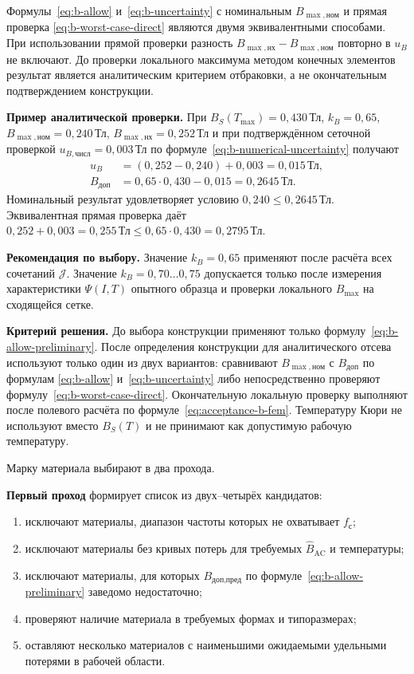 \documentclass[14pt,a4paper]{extarticle}
\newcommand{\recommend}{\par\noindent\textbf{Рекомендация по выбору.} }
\newcommand{\criterion}{\par\noindent\textbf{Критерий решения.} }
\begin{document}
Формулы~\eqref{eq:b-allow} и~\eqref{eq:b-uncertainty} с номинальным
$B_{\max,\text{ном}}$ и прямая проверка
\eqref{eq:b-worst-case-direct} являются двумя эквивалентными способами.
При использовании прямой проверки разность
$B_{\max,\text{нх}}-B_{\max,\text{ном}}$ повторно в $u_B$ не включают.
До проверки локального максимума методом конечных элементов результат
является аналитическим критерием отбраковки, а не окончательным
подтверждением конструкции.

\textbf{Пример аналитической проверки.}
При $B_S(T_{\max})=0{,}430\,\text{Тл}$, $k_B=0{,}65$,
$B_{\max,\text{ном}}=0{,}240\,\text{Тл}$,
$B_{\max,\text{нх}}=0{,}252\,\text{Тл}$ и при подтверждённом сеточной
проверкой $u_{B,\text{числ}}=0{,}003\,\text{Тл}$ по
формуле~\eqref{eq:b-numerical-uncertainty} получают
\begin{align}
 u_B&=(0{,}252-0{,}240)+0{,}003
 =0{,}015\,\text{Тл},
 \label{eq:b-uncertainty-example}\\
 B_{\text{доп}}&=
 0{,}65\cdot0{,}430-0{,}015
 =0{,}2645\,\text{Тл}.
 \label{eq:b-allow-example}
\end{align}
Номинальный результат удовлетворяет условию
$0{,}240\leq0{,}2645\,\text{Тл}$. Эквивалентная прямая проверка даёт
$0{,}252+0{,}003=0{,}255\,\text{Тл}
\leq0{,}65\cdot0{,}430=0{,}2795\,\text{Тл}$.

\recommend Значение $k_B=0{,}65$ применяют после расчёта всех сочетаний
$\mathcal J$. Значение $k_B=0{,}70\ldots0{,}75$ допускается только после
измерения характеристики $\Psi(I,T)$ опытного образца и проверки
локального $B_{\max}$ на сходящейся сетке.

\criterion До выбора конструкции применяют только
формулу~\eqref{eq:b-allow-preliminary}. После определения конструкции
для аналитического отсева используют только один из двух вариантов: сравнивают
$B_{\max,\text{ном}}$ с $B_{\text{доп}}$ по формулам
\eqref{eq:b-allow} и~\eqref{eq:b-uncertainty} либо непосредственно
проверяют формулу~\eqref{eq:b-worst-case-direct}. Окончательную локальную
проверку выполняют после полевого расчёта по
формуле~\eqref{eq:acceptance-b-fem}. Температуру Кюри не
используют вместо $B_S(T)$ и не принимают как допустимую рабочую
температуру.

Марку материала выбирают в два прохода.

\textbf{Первый проход} формирует список из двух--четырёх кандидатов:
\begin{enumerate}
 \item исключают материалы, диапазон частоты которых не охватывает
 $f_{\text{с}}$;
 \item исключают материалы без кривых потерь для требуемых
 $\widehat B_{\text{AC}}$ и температуры;
 \item исключают материалы, для которых
 $B_{\text{доп,пред}}$ по формуле~\eqref{eq:b-allow-preliminary}
 заведомо недостаточно;
 \item проверяют наличие материала в требуемых формах и типоразмерах;
 \item оставляют несколько материалов с наименьшими ожидаемыми
 удельными потерями в рабочей области.
\end{enumerate}
\end{document}
